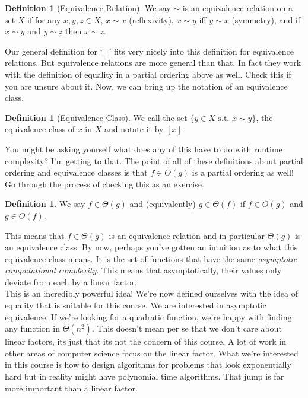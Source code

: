 \documentclass[11pt]{article}
\theoremstyle{plain}
\theoremstyle{definition}
\newtheorem{defn}[thm]{Definition} %
\newcommand{\st}{\text{ s.t. }}
\numberwithin{equation}{section}
\numberwithin{figure}{section}
\begin{document}
\begin{defn}[Equivalence Relation]
We say $\sim$ is an equivalence relation on a set $X$ if for any $x, y, z \in X$, $x \sim x$ (reflexivity), $x \sim y$ iff $y \sim x$ (symmetry), and if $x \sim y$ and $y \sim z$ then $x \sim z$.
\end{defn}

\noindent Our general definition for `=' fits very nicely into this definition for equivalence relations. But equivalence relations are more general than that. In fact they work with the definition of equality in a partial ordering above as well. Check this if you are unsure about it. Now, we can bring up the notation of an equivalence class.

\begin{defn}[Equivalence Class]
We call the set $\{ y \in X \st x \sim y \}$, the equivalence class of $x$ in $X$ and notate it by $[x]$.
\end{defn}

\noindent You might be asking yourself what does any of this have to do with runtime complexity? I'm getting to that. The point of all of these definitions about partial ordering and equivalence classes is that $f \in O(g)$ is a partial ordering as well! Go through the process of checking this as an exercise. 

\begin{defn}
We say $f \in \Theta(g)$ and (equivalently) $g \in \Theta(f)$ if $f \in O(g)$ and $g \in O(f)$.
\end{defn}

\noindent This means that $f \in \Theta(g)$ is an equivalence relation and in particular $\Theta(g)$ is an equivalence class. By now, perhaps you've gotten an intuition as to what this equivalence class means. It is the set of functions that have the same \emph{asymptotic computational complexity}. This means that asymptotically, their values only deviate from each by a linear factor. \\

\noindent This is an incredibly powerful idea! We're now defined ourselves with the idea of equality that is suitable for this course. We are interested in asymptotic equivalence. If we're looking for a quadratic function, we're happy with finding any function in $\Theta(n^2)$. This doesn't mean per se that we don't care about linear factors, its just that its not the concern of this course. A lot of work in other areas of computer science focus on the linear factor. What we're interested in this course is how to design algorithms for problems that look exponentially hard but in reality might have polynomial time algorithms. That jump is far more important than a linear factor. \\
\end{document}
